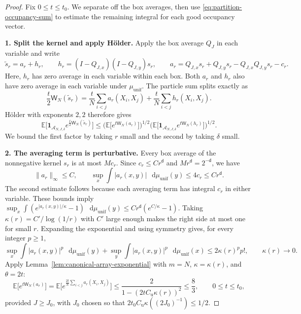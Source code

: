 \documentclass[11pt,reqno]{amsart}
\numberwithin{equation}{section}
\theoremstyle{plain}
\theoremstyle{definition}
\renewcommand{\d}{\mathsf d}
\newcommand{\dd}{\mathop{}\!\mathrm d}
\newcommand{\E}{\mathbb E}
\newcommand{\one}{\mathbf 1}
\newcommand{\muunif}{\mu_{\mathrm{unif}}}
\begin{document}
\begin{proof}
Fix $0\le t\le t_0$.  We separate off the box averages, then use \eqref{eq:partition-occupancy-sum} to estimate the remaining integral for each good occupancy vector.

\textbf{1. Split the kernel and apply H\"older.}
Apply the box average $Q_J$ in each variable and write
\begin{equation}
 \widetilde s_r=a_r+h_r,
 \qquad h_r=(I-Q_{J,x})(I-Q_{J,y})s_r,
 \qquad a_r=Q_{J,x}s_r+Q_{J,y}s_r-Q_{J,x}Q_{J,y}s_r-c_r.
 \label{eq:physical-local-centering}
\end{equation}
Here, $h_r$ has zero average in each variable within each box.  Both $a_r$ and $h_r$ also have zero average in each variable under $\muunif$.  The particle sum splits exactly as
\begin{equation}
 \frac t2\mathsf W_N(\widetilde s_r)
 =\frac tN\sum_{i<j}a_r(X_i,X_j)
  +\frac tN\sum_{i<j}h_r(X_i,X_j).
 \label{eq:physical-particle-sum-splitting}
\end{equation}
H\"older with exponents $2,2$ therefore gives
\begin{equation}
 \E\big[\one_{\mathcal A_{N,J,\delta}}e^{\frac t2\mathsf W_N(\widetilde s_r)}\big]
 \le
 \Big(\E\big[e^{t\mathsf W_N(a_r)}\big]\Big)^{1/2}
 \Big(\E\big[\one_{\mathcal A_{N,J,\delta}}e^{t\mathsf W_N(h_r)}\big]\Big)^{1/2}.
 \label{eq:physical-local-holder}
\end{equation}
We bound the first factor by taking $r$ small and the second by taking $\delta$ small. 

\textbf{2. The averaging term is perturbative.}
Every box average of the nonnegative kernel $s_r$ is at most $Mc_r$.  Since $c_r\le Cr^\d$ and $Mr^\d=2^{-\d}$, we have
\begin{equation}
 \|a_r\|_\infty\le C,
 \qquad
 \sup_x\int|a_r(x,y)|\,\dd\muunif(y)\le4c_r\le Cr^\d.
 \label{eq:physical-average-smallness}
\end{equation}
The second estimate follows because each averaging term has integral $c_r$ in either variable.  These bounds imply
$\sup_x\int(e^{|a_r(x,y)|/\kappa}-1)\,\dd\muunif(y)
\le Cr^\d(e^{C/\kappa}-1)$.
Taking $\kappa(r)=C'/\log(1/r)$ with $C'$ large enough makes the right side at most one for small $r$.  Expanding the exponential and using symmetry gives, for every integer $p\ge1$,
\begin{equation}
 \sup_x\int|a_r(x,y)|^p\,\dd\muunif(y)
 +\sup_y\int|a_r(x,y)|^p\,\dd\muunif(x)
 \le2\kappa(r)^p p!,
 \qquad \kappa(r)\longrightarrow0.
 \label{eq:physical-average-factorial}
\end{equation}
Apply Lemma~\ref{lem:canonical-array-exponential} with $m=N$, $\kappa=\kappa(r)$, and $\theta=2t$:
\begin{equation}
 \E\big[e^{t\mathsf W_N(a_r)}\big]
 =\E\Big[e^{\frac{2t}{N}\sum_{i<j}a_r(X_i,X_j)}\Big]
 \le\frac{2}{1-(2tC_{\mathrm u}\kappa(r))^2}
 \le\frac83,
 \qquad 0\le t\le t_0,
 \label{eq:physical-average-exponential-bound}
\end{equation}
provided $J\ge J_0$, with $J_0$ chosen so that $2t_0C_{\mathrm u}\kappa((2J_0)^{-1})\le1/2$.


\end{proof}
\end{document}
